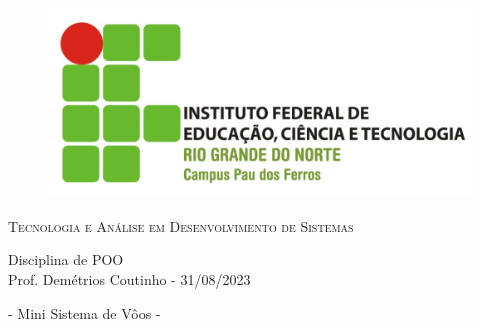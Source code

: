 \documentclass[12pt]{article}
\begin{document}
\thispagestyle{empty}
	\begin{center}
		\begin{figure}
		\centering
		\includegraphics[]{fig/if}
		\end{figure}

		{\large \scshape Tecnologia e Análise em Desenvolvimento de Sistemas}\\[1cm]

		\begin{flushleft}
		 	Disciplina de POO\\ Prof. Demétrios Coutinho - 31/08/2023\\[1cm]
		\end{flushleft}
		
		{- Mini Sistema de Vôos -}\\[1cm]
	\end{center}
	
\end{document}
